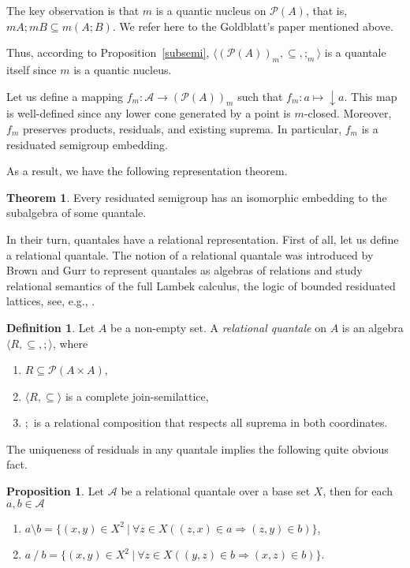 \documentclass[a4paper]{article}
\theoremstyle{definition}
\newtheorem{definition}{Definition}
\theoremstyle{theorem}
\newtheorem{theorem}{Theorem}
\theoremstyle{proposition}
\newtheorem{proposition}{Proposition}
\theoremstyle{lemma}
\theoremstyle{ex}
\theoremstyle{corollary}
\theoremstyle{claim}
\begin{document}
The key observation is that $m$ is a quantic nucleus on $\mathcal{P}(A)$, that is, $m A ; m B \subseteq m (A ; B)$. We refer here to the Goldblatt's paper mentioned above.

Thus, according to Proposition~\ref{subsemi}, $\langle (\mathcal{P}(A))_m, \subseteq, ;_m \rangle$ is a quantale itself since $m$ is a quantic nucleus.

Let us define a mapping $f_m : \mathcal{A} \to (\mathcal{P}(A))_m$ such that $f_m : a \mapsto \downarrow a$. This map is well-defined since any lower cone generated by a point is $m$-closed. Moreover, $f_m$ preserves products, residuals, and existing suprema. In particular, $f_m$ is a residuated semigroup embedding.

As a result, we have the following representation theorem.

\begin{theorem} \label{orsRep}
  Every residuated semigroup has an isomorphic embedding to the subalgebra of some quantale.
\end{theorem}

In their turn, quantales have a relational representation. First of all, let us define a relational quantale.
The notion of a relational quantale was introduced by Brown and Gurr to represent quantales as algebras of relations and study relational semantics of the full Lambek calculus, the logic of bounded residuated lattices, see, e.g., \cite{brown1993representation}.
\begin{definition}
  Let $A$ be a non-empty set. A \emph{relational quantale} on $A$ is an algebra $\langle R, \subseteq, ; \rangle$, where
  \begin{enumerate}
    \item $R \subseteq \mathcal{P}(A \times A)$,
    \item $\langle R, \subseteq \rangle$ is a complete join-semilattice,
    \item $;$ is a relational composition that respects all suprema in both coordinates.
  \end{enumerate}
\end{definition}

The uniqueness of residuals in any quantale implies the following quite obvious fact.
\begin{proposition}\label{ok}
  Let $\mathcal{A}$ be a relational quantale over a base set $X$, then for each $a, b \in \mathcal{A}$
  \begin{enumerate}
    \item $a \setminus b = \{ (x, y) \in X^2 \: | \: \forall z \in X ( (z, x) \in a \Rightarrow (z, y) \in b) \}$,
    \item $a \: / \: b = \{ (x, y) \in X^2 \: | \: \forall z \in X ( (y, z) \in b \Rightarrow (x, z) \in b )\}$.
  \end{enumerate}
\end{proposition}
\end{document}

